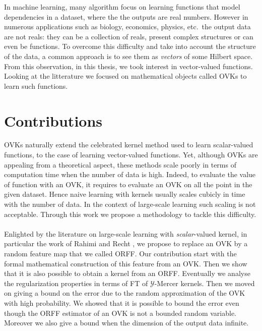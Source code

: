 In machine learning, many algorithm focus on learning functions that model
dependencies in a dataset, where the the outputs are real numbers. However
in numerous applications such as biology, economics, physics, etc.~the
output data are not reals: they can be a collection of reals, present
complex structures or can even be functions. To overcome this difficulty
and take into account the structure of the data, a common approach is to
see them as \emph{vectors} of some Hilbert space. From this observation, in
this thesis, we took interest in vector-valued functions. Looking at the
litterature we focused on mathematical objects called \aclp{OVK} to learn
such functions.

\section{Contributions}
\acsp{OVK} naturally extend the celebrated kernel method used to learn
scalar-valued functions, to the case of learning vector-valued functions.
Yet, although \acsp{OVK} are appealing from a theoretical aspect, these
methods scale poorly in terms of computation time when the number of data
is high. Indeed, to evaluate the value of function with an \acl{OVK}, it
requires to evaluate an \acl{OVK} on all the point in the given dataset.
Hence naive learning with kernels usually scales cubicly in time with the
number of data. In the context of large-scale learning such scaling is not
acceptable. Through this work we propose a methodology to tackle this
difficulty.
\paragraph{}
Enlighted by the literature on large-scale learning with
\emph{scalar}-valued kernel, in particular the work of Rahimi and Recht
\citep{Rahimi2007}, we propose to replace an \acs{OVK} by a random feature
map that we called \acl{ORFF}. Our contribution start with the formal
mathematical construction of this feature from an \acs{OVK}. Then we show
that it is also possible to obtain a kernel from an \acs{ORFF}. Eventually
we analyse the regularization properties in terms of \acl{FT} of
$\mathcal{Y}$-Mercer kernels. Then we moved on giving a bound on the error
due to the random approximation of the \acs{OVK} with high probability.
We showed that it is possible to bound the error even though the \acs{ORFF}
estimator of an \acs{OVK} is not a bounded random variable. Moreover we
also give a bound when the dimension of the output data infinite.
